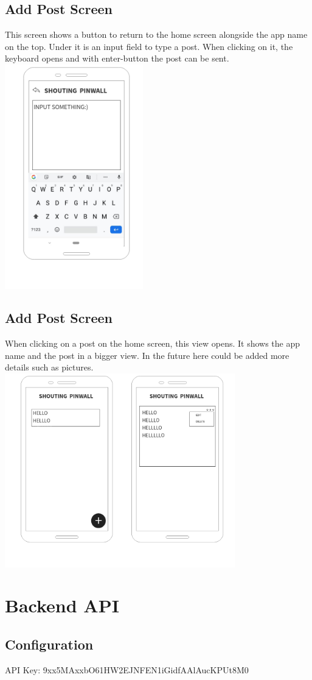 \documentclass[conference]{IEEEtran}
\numberwithin{figure}{subsection}
\begin{document}
\subsection{Add Post Screen}
This screen shows a button to return to the home screen alongside the app name on the top. Under it is an input field to type a post. When clicking on it, the keyboard opens and with enter-button the post can be sent.\\
\includegraphics[width=6cm]{bibtex/images/Add_Post_Screen.png}

\subsection{Add Post Screen}
When clicking on a post on the home screen, this view opens. It shows the app name and the post in a bigger view. In the future here could be added more details such as pictures.\\
\includegraphics[width=10cm]{bibtex/images/Post_Viewing_Screen.png}




\section{Backend API}
\subsection{Configuration}
API Key: 9xx5MAxxbO61HW2EJNFEN1iGidfAAlAucKPUt8M0\\




			
\end{document}

